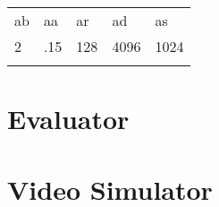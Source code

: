 \documentclass[10pt,a4paper]{report}
\newcommand{\mytoprule}{\specialrule{0.2em}{0em}{0em}}
\newcommand{\mymidrule}{\specialrule{0.1em}{0em}{0em}}
\newcommand{\mybottomrule}{\specialrule{0.2em}{0em}{0em}}
\begin{document}
\renewcommand{\arraystretch}{1.5}
	\begin{longtable}{p{3cm}p{3cm}p{3cm}p{3cm}p{3cm}}
		\mytoprule
		\rowcolor{dunkelgrau}
			ab & aa & ar & ad & as \\
		\mymidrule
			2 & .15 & 128 & 4096 & 1024 \\
		\mybottomrule
	\end{longtable} 

\section{Evaluator}

\section{Video Simulator}
\end{document}
